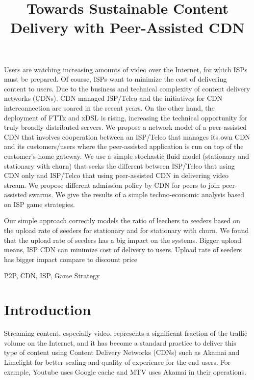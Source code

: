 \documentclass[paper]{ieice}
\title{Towards Sustainable Content Delivery with Peer-Assisted CDN}
\begin{document}
\maketitle

\begin{summary}
Users are watching increasing amounts of video over the Internet,
for which ISPs must be prepared.  Of course, ISPs want to minimize
the cost of delivering content to users.  Due to the business and
technical complexity of content delivery networks (CDNs), CDN
managed ISP/Telco and the initiatives for CDN interconnection are
soared in the recent years.  On the other hand, the deployment of
FTTx and xDSL is rising, increasing the technical opportunity for
truly broadly distributed servers.  We propose a network model of a
peer-assisted CDN that involves cooperation between an ISP/Telco
that manages its own CDN and its customers/users where the
peer-assisted application is run on top of the customer's home
gateway.  We use a simple stochastic fluid model (stationary and
stationary with churn) that seeks the different between ISP/Telco
that using CDN only and ISP/Telco that using peer-assisted CDN in
delivering video stream. We propose different admission policy by
CDN for peers to join peer-assisted swarms.  We give the results of
a simple techno-economic analysis based on ISP game strategies.

Our simple approach correctly models the ratio of leechers to
seeders based on the upload rate of seeders for stationary and for
stationary with churn.  We found that the upload rate of seeders has
a big impact on the systems.  Bigger upload means, ISP CDN can
minimize cost of delivery to users.  Upload rate of seeders has
bigger impact compare to discount price


\end{summary}
\begin{keywords}
P2P, CDN, ISP, Game Strategy
\end{keywords}  

\section{Introduction}\label{intro}
Streaming content, especially video, represents a significant fraction
of the traffic volume on the Internet, and it has become a standard
practice to deliver this type of content using Content Delivery
Networks (CDNs) such as Akamai and Limelight for better scaling and
quality of experience for the end users.  For example, Youtube uses
Google cache and MTV uses Akamai in their operations.
\end{document}
